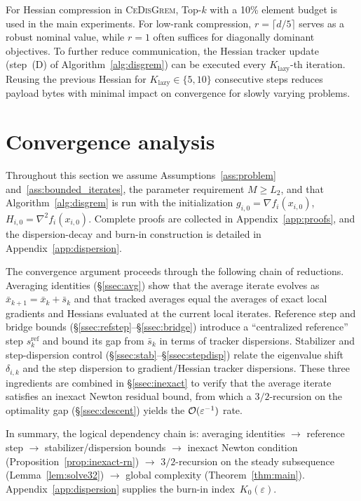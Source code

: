 \documentclass[review,onefignum,onetabnum]{siamart171218}
\begin{document}
	For Hessian compression in \textsc{CeDisGrem}, Top-$k$ with a 10\%
	element budget is used in the main experiments.
	For low-rank compression, $r=\lceil d/5\rceil$ serves as a robust
	nominal value, while $r=1$ often suffices for diagonally dominant objectives.
	To further reduce communication, the Hessian tracker update
	(step~(D) of Algorithm~\ref{alg:disgrem}) can be executed every
	$K_{\mathrm{lazy}}$-th iteration.
	Reusing the previous Hessian for
	$K_{\mathrm{lazy}}\in\{5,10\}$ consecutive steps reduces
	payload bytes with minimal impact on convergence for slowly varying
	problems.
	
	
	\section{Convergence analysis}\label{sec:theory}
	Throughout this section we assume Assumptions~\ref{ass:problem}
	and~\ref{ass:bounded_iterates}, the parameter requirement $M\ge L_2$,
	and that
	Algorithm~\ref{alg:disgrem} is run with the initialization
	$g_{i,0}=\nabla f_i(x_{i,0})$, $H_{i,0}=\nabla^2 f_i(x_{i,0})$.
	Complete proofs are collected in Appendix~\ref{app:proofs}, and the
	dispersion-decay and burn-in construction is detailed in
	Appendix~\ref{app:dispersion}.
	
	The convergence argument proceeds through the following chain of
	reductions.
	Averaging identities (\S\ref{ssec:avg}) show that the average iterate evolves as
	$\bar x_{k+1}=\bar x_k+\bar s_k$ and that tracked averages
	equal the averages of exact local gradients and Hessians evaluated
	at the current local iterates.
	Reference step and bridge bounds
	(\S\ref{ssec:refstep}--\S\ref{ssec:bridge}) introduce a
	``centralized reference'' step $s_k^{\mathrm{ref}}$ and bound
	its gap from $\bar s_k$ in terms of tracker dispersions.
	Stabilizer and step-dispersion control
	(\S\ref{ssec:stab}--\S\ref{ssec:stepdisp}) relate the
	eigenvalue shift $\delta_{i,k}$ and the step dispersion to
	gradient/Hessian tracker dispersions.
	These three ingredients are combined in \S\ref{ssec:inexact}
	to verify that the
	average iterate satisfies an inexact Newton residual bound,
	from which a $3/2$-recursion on the
	optimality gap (\S\ref{ssec:descent}) yields the $\mathcal{O}(\varepsilon^{-1})$ rate.
	
	In summary, the logical dependency chain is:
	averaging identities $\to$ reference step $\to$ stabilizer/dispersion bounds
	$\to$ inexact Newton condition (Proposition~\ref{prop:inexact-rn})
	$\to$ $3/2$-recursion on the steady subsequence
	(Lemma~\ref{lem:solve32})
	$\to$ global complexity (Theorem~\ref{thm:main}).
	Appendix~\ref{app:dispersion} supplies the burn-in index~$K_0(\varepsilon)$.
	
\end{document}
